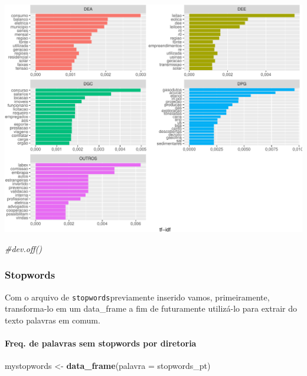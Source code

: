 \documentclass[]{article}
\newenvironment{Shaded}{\begin{snugshade}}{\end{snugshade}}
\newcommand{\KeywordTok}[1]{\textcolor[rgb]{0.13,0.29,0.53}{\textbf{#1}}}
\newcommand{\DataTypeTok}[1]{\textcolor[rgb]{0.13,0.29,0.53}{#1}}
\newcommand{\StringTok}[1]{\textcolor[rgb]{0.31,0.60,0.02}{#1}}
\newcommand{\CommentTok}[1]{\textcolor[rgb]{0.56,0.35,0.01}{\textit{#1}}}
\newcommand{\NormalTok}[1]{#1}
\let\oldparagraph\paragraph
\renewcommand{\paragraph}[1]{\oldparagraph{#1}\mbox{}}
\begin{document}
\includegraphics{markdown_v31_files/figure-latex/unnamed-chunk-42-1.pdf}

\begin{Shaded}
\begin{Highlighting}[]
\CommentTok{#dev.off()}
\end{Highlighting}
\end{Shaded}

\subsubsection{Stopwords}\label{stopwords}

Com o arquivo de \texttt{stopwords}previamente inserido vamos,
primeiramente, transforma-lo em um data\_frame a fim de futuramente
utilizá-lo para extrair do texto palavras em comum.

\paragraph{\texorpdfstring{Freq. de palavras sem \textbf{stopwords} por
diretoria}{Freq. de palavras sem stopwords por diretoria}}\label{freq.-de-palavras-sem-stopwords-por-diretoria}

\begin{Shaded}
\begin{Highlighting}[]
\NormalTok{mystopwords <-}\StringTok{ }\KeywordTok{data_frame}\NormalTok{(}\DataTypeTok{palavra =}\NormalTok{ stopwords_pt)}
\end{Highlighting}
\end{Shaded}
\end{document}
